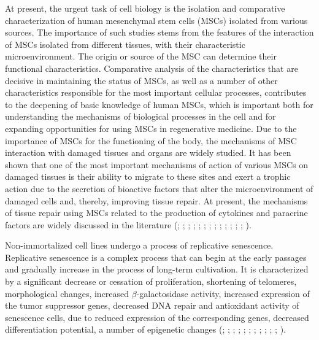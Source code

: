 \documentclass[alpha-refs]{wiley-article}
\begin{document}
At present, the urgent task of cell biology is the isolation and comparative characterization of human mesenchymal stem cells (MSCs) isolated from various sources.
The importance of such studies stems from the features of the interaction of MSCs isolated from different tissues, with their characteristic microenvironment.
The origin or source of the MSC can determine their functional characteristics.
Comparative analysis of the characteristics that are decisive in maintaining the status of MSCs, as well as a number of other characteristics responsible for the most important cellular processes, contributes to the deepening of basic knowledge of human MSCs, which is important both for understanding the mechanisms of biological processes in the cell and for expanding opportunities for using MSCs in regenerative medicine.
Due to the importance of MSCs for the functioning of the body, the mechanisms of MSC interaction with damaged tissues and organs are widely studied.
It has been shown that one of the most important mechanisms of action of various MSCs on damaged tissues is their ability to migrate to these sites and exert a trophic action due to the secretion of bioactive factors that alter the microenvironment of damaged cells and, thereby, improving tissue repair.
At present, the mechanisms of tissue repair using MSCs related to the production of cytokines and paracrine factors are widely discussed in the literature (\cite{phinney2007concise}; \cite{m2011mesenchymal}; \cite{guiducci2011bone}; \cite{gruenloh2011characterization}; \cite{huang2013effects}; \cite{luo2013mesenchymal}; \cite{ando2014stem}; \cite{hendijani2015human}; \cite{hendijani2015effect}; \cite{danieli2016testing}; \cite{julianto2016topical}; \cite{teixeira2017impact}; \cite{vulcano2016wharton}; \cite{zachar2016activation}).


Non-immortalized cell lines undergo a process of replicative senescence.
Replicative senescence is a complex process that can begin at the early passages and gradually increase in the process of long-term cultivation.
It is characterized by a significant decrease or cessation of proliferation, shortening of telomeres, morphological changes, increased $\beta$-galactosidase activity, increased expression of the tumor suppressor genes, decreased DNA repair and antioxidant activity of senescence cells, due to reduced expression of the corresponding genes, decreased differentiation potential, a number of epigenetic changes (\cite{wagner2008replicative}; \cite{kuilman2010essence}; \cite{redaelli2012cytogenomic}; \cite{estrada2013human}; \cite{savickiene2016senescence}; \cite{danisovic2017effect}; \cite{koltsova2018dynamics}; \cite{alessio2018mesenchymal}; \cite{krylova2018isolation}; \cite{niedernhofer2018nuclear}; \cite{truong2018characterization}; \cite{yu2018replicative}).
\end{document}
